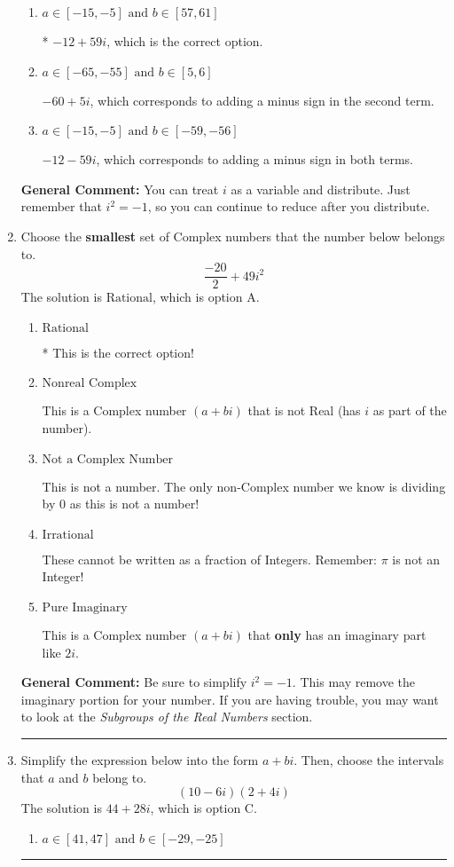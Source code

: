 \documentclass{extbook}[14pt]
\newcommand{\litem}[1]{\item #1

\rule{\textwidth}{0.4pt}}
\begin{document}
\begin{enumerate}
{\begin{enumerate}[label=\Alph*.]
 $-36 - 24 i$, which corresponds to just multiplying the real terms to get the real part of the solution and the coefficients in the complex terms to get the complex part.
\item \( a \in [-15, -5] \text{ and } b \in [57, 61] \)

* $-12 + 59 i$, which is the correct option.
\item \( a \in [-65, -55] \text{ and } b \in [5, 6] \)

 $-60 + 5 i$, which corresponds to adding a minus sign in the second term.
\item \( a \in [-15, -5] \text{ and } b \in [-59, -56] \)

 $-12 - 59 i$, which corresponds to adding a minus sign in both terms.
\end{enumerate}

\textbf{General Comment:} You can treat $i$ as a variable and distribute. Just remember that $i^2=-1$, so you can continue to reduce after you distribute.
}
\litem{
Choose the \textbf{smallest} set of Complex numbers that the number below belongs to.
\[ \frac{-20}{2}+49i^2 \]The solution is \( \text{Rational} \), which is option A.\begin{enumerate}[label=\Alph*.]
\item \( \text{Rational} \)

* This is the correct option!
\item \( \text{Nonreal Complex} \)

This is a Complex number $(a+bi)$ that is not Real (has $i$ as part of the number).
\item \( \text{Not a Complex Number} \)

This is not a number. The only non-Complex number we know is dividing by 0 as this is not a number!
\item \( \text{Irrational} \)

These cannot be written as a fraction of Integers. Remember: $\pi$ is not an Integer!
\item \( \text{Pure Imaginary} \)

This is a Complex number $(a+bi)$ that \textbf{only} has an imaginary part like $2i$.
\end{enumerate}

\textbf{General Comment:} Be sure to simplify $i^2 = -1$. This may remove the imaginary portion for your number. If you are having trouble, you may want to look at the \textit{Subgroups of the Real Numbers} section.
}
\litem{
Simplify the expression below into the form $a+bi$. Then, choose the intervals that $a$ and $b$ belong to.
\[ (10 - 6 i)(2 + 4 i) \]The solution is \( 44 + 28 i \), which is option C.\begin{enumerate}[label=\Alph*.]
\item \( a \in [41, 47] \text{ and } b \in [-29, -25] \)


\end{enumerate}}
\end{enumerate}
\end{document}

